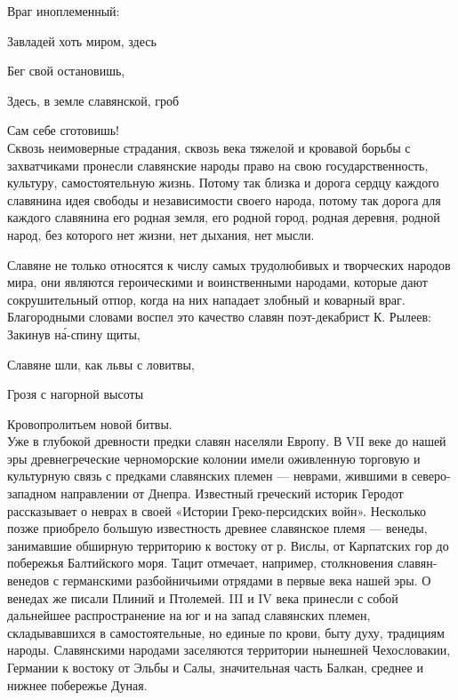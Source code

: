 \documentclass[12pt, a4paper, openany]{book}
\begin{document}
\hangindent=5.5cm  Враг иноплеменный:

\hangindent=4.5cm  Завладей хоть миром, здесь

\hangindent=5.5cm  Бег свой остановишь,

\hangindent=4.5cm  Здесь, в земле славянской, гроб

\hangindent=5.5cm  Сам себе сготовишь!
\ \\

Сквозь неимоверные страдания, сквозь века тяжелой и кровавой борьбы с захватчиками пронесли славянские народы право на свою государственность, культуру, самостоятельную жизнь. Потому так близка и дорога сердцу каждого славянина идея свободы и независимости своего народа, потому так дорога для каждого славянина его родная земля, его родной город, родная деревня, родной народ, без которого нет жизни, нет дыхания, нет мысли.

Славяне не только относятся к числу самых трудолюбивых и творческих народов мира, они являются героическими и воинственными народами, которые дают сокрушительный отпор, когда на них нападает злобный и коварный враг. Благородными словами воспел это качество славян поэт-декабрист К. Рылеев:
\ \\


\hangindent=4.5cm  Закинув н\'{а}-спину щиты,

\hangindent=4.5cm  Славяне шли, как львы с ловитвы,

\hangindent=4.5cm  Грозя с нагорной высоты

\hangindent=4.5cm  Кровопролитьем новой битвы.
\ \\

Уже в глубокой древности предки славян населяли Европу. В VII веке до нашей эры древнегреческие черноморские колонии имели оживленную торговую и культурную связь с предками славянских племен — неврами, жившими в северо-западном направлении от Днепра. Известный греческий историк Геродот рассказывает о неврах в своей «Истории Греко-персидских войн». Несколько позже приобрело большую известность древнее славянское племя — венеды, занимавшие обширную территорию к востоку от р. Вислы, от Карпатских гор до побережья Балтийского моря. Тацит отмечает, например, столкновения славян-венедов с германскими разбойничьими отрядами в первые века нашей эры. О венедах же писали Плиний и Птолемей. III и IV века принесли с собой дальнейшее распространение на юг и на запад славянских племен, складывавшихся в самостоятельные, но единые по крови, быту духу, традициям народы. Славянскими народами заселяются территории нынешней Чехословакии, Германии к востоку от Эльбы и Салы, значительная часть Балкан, среднее и нижнее побережье Дуная.
\end{document}
